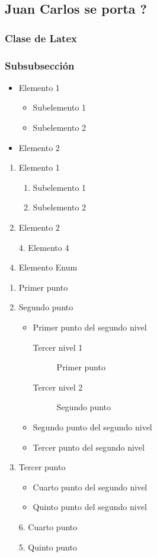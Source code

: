 \documentclass[a4paper, 11pt]{article}  %
\begin{document}
	\subsection{Juan Carlos se porta ?}
	\subsubsection{Clase de Latex}
	\subsubsection[Cap2]{Subsubsección}
	
	\begin{itemize}
		\item Elemento 1 \begin{itemize}
			\item Subelemento 1
			\item Subelemento 2
		\end{itemize}
		\item Elemento 2
	\end{itemize}
	
	\begin{enumerate}
		\item Elemento 1 \begin{enumerate}
				\item Subelemento 1
				\item Subelemento 2
			\end{enumerate}
		\item Elemento 2
		\item[4.] Elemento 4
		\setcounter{enumi}{10}
		\item Elemento Enum %
	\end{enumerate}
	\newpage
	\begin{enumerate}
		\item Primer punto
		\item Segundo punto
		\begin{itemize}
			\item Primer punto del segundo nivel
			\begin{description}
				\item[Tercer nivel 1] Primer punto
				\item[Tercer nivel 2] Segundo punto
			\end{description}
			\item Segundo punto del segundo nivel
			\item Tercer punto del segundo nivel
		\end{itemize}
		\item Tercer punto
		\begin{itemize}
			\item Cuarto punto del segundo nivel
			\item Quinto punto del segundo nivel
		\end{itemize}
		\item[6.] Cuarto punto
		\item[5.] Quinto punto
	\end{enumerate}
	
	
\end{document}
